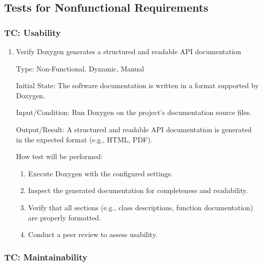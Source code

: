 \documentclass[12pt, titlepage]{article}
\begin{document}
\begin{enumerate}
\end{enumerate}

\subsection{Tests for Nonfunctional Requirements}

 \label{TC_USABILITY}
\subsubsection{TC\thetestcasenum : Usability}

\begin{enumerate}

  \item{Verify Doxygen generates a structured and readable API documentation \\}

  Type: Non-Functional, Dynamic, Manual

  Initial State: The software documentation is written in a format supported by
  Doxygen.

  Input/Condition: Run Doxygen on the project’s documentation source files.

  Output/Result: A structured and readable API documentation is generated in the
  expected format (e.g., HTML, PDF).

  How test will be performed:
  \begin{enumerate}
    \item Execute Doxygen with the configured settings.
    \item Inspect the generated documentation for completeness and readability.
    \item Verify that all sections (e.g., class descriptions, function
    documentation) are properly formatted.
    \item Conduct a peer review to assess usability.
  \end{enumerate}
\end{enumerate}

 \label{TC_MAINTAINABILITY}
\subsubsection{TC\thetestcasenum : Maintainability}
\end{document}
